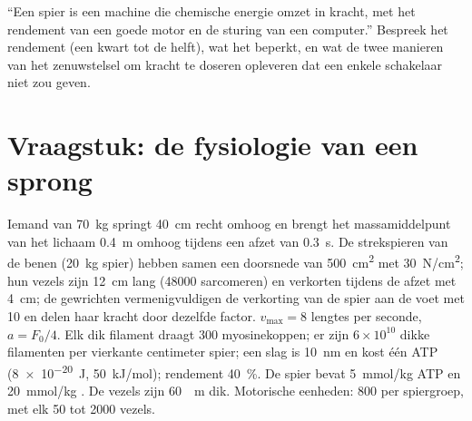 \begin{exercise}[$\star\star\star$]\label{exo:b2:muscle-movement:12}
``Een spier is een machine die chemische energie omzet in kracht, met het
rendement van een goede motor en de sturing van een computer.'' Bespreek het
rendement (een kwart tot de helft), wat het beperkt, en wat de twee manieren
van het zenuwstelsel om kracht te doseren opleveren dat een enkele schakelaar
niet zou geven.
\end{exercise}

\section{Vraagstuk: de fysiologie van een sprong}

\begin{problem}
\label{pb:b2:muscle-movement:1}
Iemand van \qty{70}{kg} springt \qty{40}{cm} recht omhoog en brengt het
massamiddelpunt van het lichaam \qty{0.4}{m} omhoog tijdens een afzet van
\qty{0.3}{s}. De strekspieren van de benen (\qty{20}{kg} spier) hebben samen
een doorsnede van \qty{500}{cm^2} met \qty{30}{N/cm^2}; hun vezels zijn
\qty{12}{cm} lang (\num{48000} sarcomeren) en verkorten tijdens de afzet met
\qty{4}{cm}; de gewrichten vermenigvuldigen de verkorting van de spier aan de
voet met \num{10} en delen haar kracht door dezelfde factor. $v_{\max} = 8$
lengtes per seconde, $a = F_0/4$. Elk dik filament draagt \num{300}
myosinekoppen; er zijn $6\times
10^{10}$ dikke filamenten per vierkante centimeter spier; een slag
is \qty{10}{nm} en kost één ATP (\qty{8e-20}{J}, \qty{50}{kJ/mol});
rendement \qty{40}{\%}. De spier bevat \qty{5}{mmol/kg} ATP en
\qty{20}{mmol/kg} . De vezels zijn \qty{60}{\micro
m} dik. Motorische eenheden: \num{800} per spiergroep, met elk \num{50} tot
\num{2000} vezels.


\end{problem}
